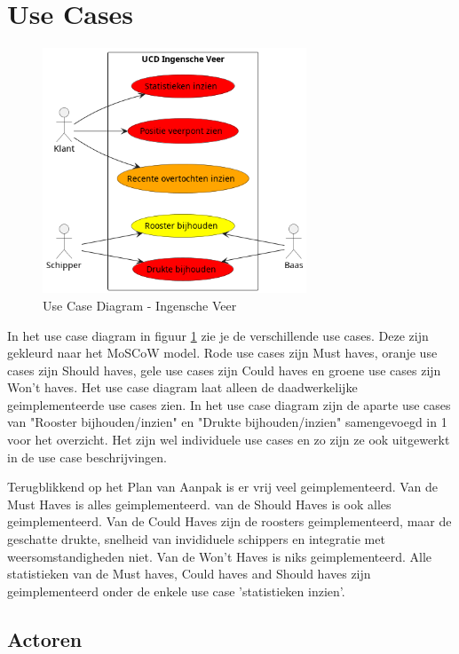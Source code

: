 \documentclass{article}
\begin{document}
\section{Use Cases}
\begin{figure}[H]
    \centering
    \includegraphics[width=0.7\textwidth]{images/ucd.png}
    \caption{Use Case Diagram - Ingensche Veer}
    \label{fig:ucd}
\end{figure}

In het use case diagram in figuur \ref{fig:ucd} zie je de verschillende use cases. Deze zijn gekleurd naar het MoSCoW model. Rode use cases zijn Must haves, oranje use cases zijn Should haves, gele use cases zijn Could haves en groene use cases zijn Won't haves.
Het use case diagram laat alleen de daadwerkelijke geimplementeerde use cases zien. 
In het use case diagram zijn de aparte use cases van "Rooster bijhouden/inzien" en "Drukte bijhouden/inzien" samengevoegd in 1 voor het overzicht. Het zijn wel individuele use cases en zo zijn ze ook uitgewerkt in de use case beschrijvingen.
\par\smallskip
Terugblikkend op het Plan van Aanpak is er vrij veel geimplementeerd.
Van de Must Haves is alles geimplementeerd. van de Should Haves is ook alles geimplementeerd. Van de Could Haves zijn de roosters geimplementeerd, maar de geschatte drukte, snelheid van invididuele schippers en integratie met weersomstandigheden niet. Van de Won't Haves is niks geimplementeerd.
Alle statistieken van de Must haves, Could haves and Should haves zijn geimplementeerd onder de enkele use case 'statistieken inzien'.


\subsection{Actoren}
\end{document}
